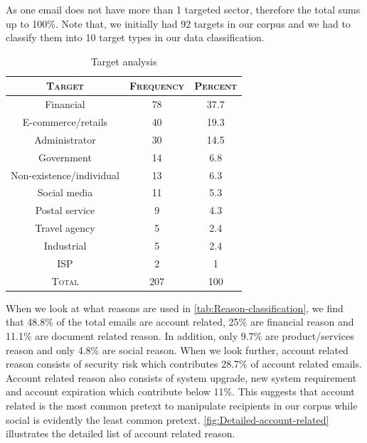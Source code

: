 As one email does not have more than 1 targeted sector, therefore
the total sums up to 100\%. Note that, we initially had 92 targets
in our corpus and we had to classify them into 10 target types in
our data classification.

\begin{table}[h]
\begin{centering}
\begin{tabular}{ccc}
\toprule 
\textsc{\small{}Target} & \textsc{\small{}Frequency} & \textsc{\small{}Percent}\tabularnewline
\midrule
\midrule 
{\small{}Financial} & {\small{}78} & {\small{}37.7}\tabularnewline
\midrule 
{\small{}E-commerce/retails} & {\small{}40} & {\small{}19.3}\tabularnewline
\midrule 
{\small{}Administrator} & {\small{}30} & {\small{}14.5}\tabularnewline
\midrule 
{\small{}Government} & {\small{}14} & {\small{}6.8}\tabularnewline
\midrule 
{\small{}Non-existence/individual} & {\small{}13} & {\small{}6.3}\tabularnewline
\midrule 
{\small{}Social media} & {\small{}11} & {\small{}5.3}\tabularnewline
\midrule 
{\small{}Postal service} & {\small{}9} & {\small{}4.3}\tabularnewline
\midrule 
{\small{}Travel agency} & {\small{}5} & {\small{}2.4}\tabularnewline
\midrule 
{\small{}Industrial} & {\small{}5} & {\small{}2.4}\tabularnewline
\midrule 
{\small{}ISP} & {\small{}2} & {\small{}1}\tabularnewline
\midrule
\midrule 
\textsc{\small{}Total} & \textsc{\small{}207} & \textsc{\small{}100}\tabularnewline
\bottomrule
\end{tabular}
\par\end{centering}

\begin{centering}
\protect\caption{\label{tab:Target-analysis}Target analysis}

\par\end{centering}

%
%
\end{table}


When we look at what reasons are used in \autoref{tab:Reason-classification},
we find that 48.8\% of the total emails are account related, 25\%
are financial reason and 11.1\% are document related reason. In addition,
only 9.7\% are product/services reason and only 4.8\% are social reason.
When we look further, account related reason consists of security
risk which contributes 28.7\% of account related emails. Account related
reason also consists of system upgrade, new system requirement and
account expiration which contribute below 11\%. This suggests that
account related is the most common pretext to manipulate recipients
in our corpus while social is evidently the least common pretext.
\autoref{fig:Detailed-account-related} illustrates the detailed list
of account related reason.

